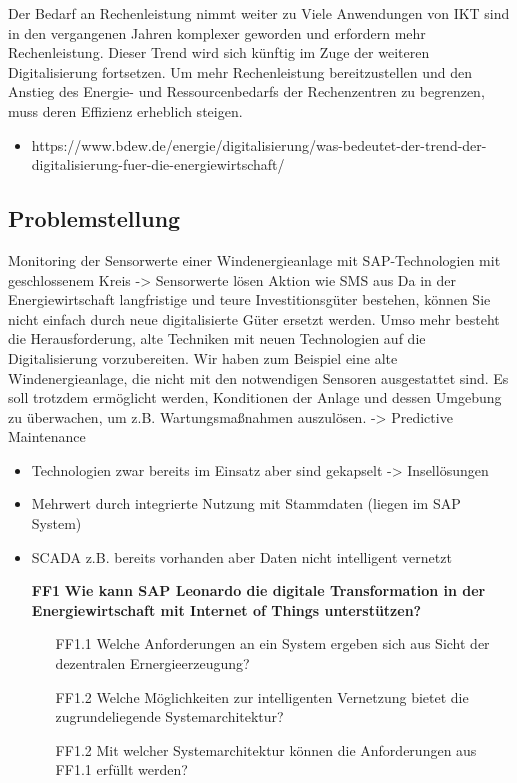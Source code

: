 Der Bedarf an Rechenleistung nimmt weiter zu
Viele Anwendungen von IKT sind in den vergangenen Jahren komplexer geworden und erfordern mehr Rechenleistung. Dieser Trend wird sich künftig im Zuge der weiteren Digitalisierung fortsetzen. Um mehr Rechenleistung bereitzustellen und den Anstieg des Energie- und Ressourcenbedarfs der Rechenzentren zu begrenzen, muss deren Effizienz erheblich steigen.

\begin{itemize}
  \item https://www.bdew.de/energie/digitalisierung/was-bedeutet-der-trend-der-digitalisierung-fuer-die-energiewirtschaft/
\end{itemize}

\subsection{Problemstellung}
Monitoring der Sensorwerte einer Windenergieanlage mit SAP-Technologien mit geschlossenem Kreis -> Sensorwerte lösen Aktion wie SMS aus
\newline
Da in der Energiewirtschaft langfristige und teure Investitionsgüter bestehen, können Sie nicht einfach durch neue
digitalisierte Güter ersetzt werden. Umso mehr besteht die Herausforderung, alte Techniken mit neuen Technologien
auf die Digitalisierung vorzubereiten. Wir haben zum Beispiel eine alte Windenergieanlage, die nicht mit den
notwendigen Sensoren ausgestattet sind. Es soll trotzdem ermöglicht werden, Konditionen der Anlage und dessen Umgebung
zu überwachen, um z.B. Wartungsmaßnahmen auszulösen. -> Predictive Maintenance

\begin{itemize}
  \item Technologien zwar bereits im Einsatz aber sind gekapselt -> Insellösungen
  \item Mehrwert durch integrierte Nutzung mit Stammdaten (liegen im SAP System)
  \item SCADA z.B. bereits vorhanden aber Daten nicht intelligent vernetzt
\end{itemize}


\begin{itemize}
  \item[\textbf{FF1}] \textbf{Wie kann SAP Leonardo die digitale Transformation in der Energiewirtschaft mit Internet of Things unterstützen?}
  \begin{itemize}
    \item[FF1.1] Welche Anforderungen an ein System ergeben sich aus Sicht der dezentralen Ernergieerzeugung?
    \item[FF1.2] Welche Möglichkeiten zur intelligenten Vernetzung bietet die zugrundeliegende Systemarchitektur?
    \item[FF1.2] Mit welcher Systemarchitektur können die Anforderungen aus FF1.1 erfüllt werden?
  \end{itemize}
\end{itemize}

